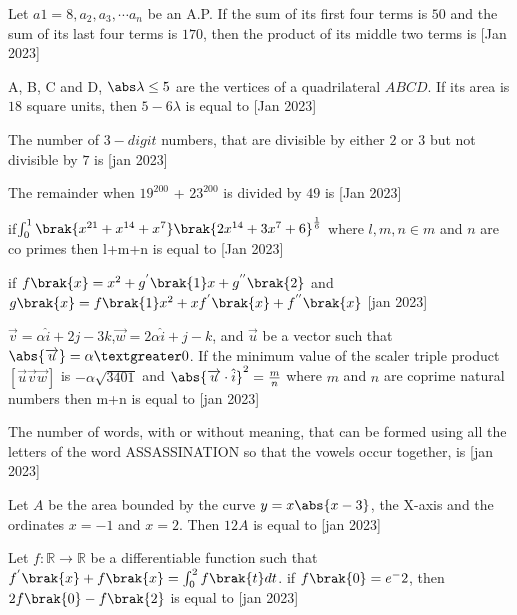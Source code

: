 \iffalse
\title{Assignment 3}
\author{AI24BTECH11018}
\section{integer}
\fi
\item Let $a1 = 8, a_2, a_3,\cdots  a_n$ be an A.P. If the sum of its 
first four terms is $50$ and the sum of its last four 
terms is $170$, then the product of its middle two 
terms is
\hfill{[Jan 2023]}
\item A, B, C and D, 
$\abs \lambda \leq 5$ are the vertices of a quadrilateral $ABCD$. If 
its area is $18$ square units, then $5-6\lambda$ is equal to
\hfill{[Jan 2023]}
\item The number of 
$3-digit$ numbers, that are divisible 
by either $2$ or $3$ but not divisible by $7$ is
\hfill{[jan 2023]}
\item The remainder when $19^{200}$ + $23^{200}$ is divided by $49$
is 
\hfill{[Jan 2023]}
\item if$\int_{0}^{1}\brak{x^{21}+x^{14}+x^7}\brak{2x^{14}+3x^{7}+6}^\frac{1}{6}$ where $l,m,n \in m$ and $n$ are co primes then l+m+n is equal to
\hfill{[Jan 2023]}
\item if $f\brak{x}=x^2+g^{'}\brak{1}x+g^{''}\brak{2}$ and $g\brak{x}=f\brak{1}x^2+xf^{'}\brak{x}+f^{''}\brak{x}$
\hfill{[jan 2023]}
\item $\overrightarrow{v}=\alpha \hat{i}+2j-3k$,$\overrightarrow{w}=2\alpha \hat{i}+j-k$, and $\overrightarrow{u}$ be a vector such that $\abs {\overrightarrow{u}}=\alpha  \textgreater 0$. If the minimum value of the scaler triple product $[\overrightarrow{u} \overrightarrow{v} \overrightarrow{w}]$ is $-\alpha \sqrt{3401}$ and $\abs {\overrightarrow{u}\cdot \hat{i}}^2=\frac{m}{n}$ where $m$ and $n$ are coprime natural numbers then m+n is equal to
\hfill{[jan 2023]}
\item The number of words, with or without meaning, 
that can be formed using all the letters of the word 
ASSASSINATION so that the vowels occur 
together, is
\hfill{[jan 2023]}
\item Let $A$ be the area bounded by the curve $y=x\abs {x-3}$, the X-axis and the ordinates $x=-1$ and $x=2$. Then $12A$ is equal to 
\hfill{[jan 2023]}
\item Let $f:\mathbb{R} \to \mathbb{R}$ be a differentiable function such that $f^{'}\brak{x}+f\brak{x}=\int_{0}^{2}f\brak{t}dt$. if $f\brak{0}=e^-2$, then $2f\brak{0}-f\brak{2}$ is equal to
\hfill{[jan 2023]}

%
